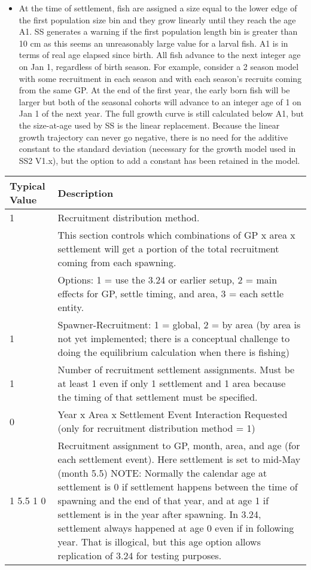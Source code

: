\begin{description}
\begin{itemize}
		\item At the time of settlement, fish are assigned a size equal to the lower edge of the first population size bin and they grow linearly until they reach the age A1.  SS generates a warning if the first population length bin is greater than 10 cm as this seems an unreasonably large value for a larval fish.  A1 is in terms of real age elapsed since birth.  All fish advance to the next integer age on Jan 1, regardless of birth season.  For example, consider a 2 season model with some recruitment in each season and with each season’s recruits coming from the same GP.  At the end of the first year, the early born fish will be larger but both of the seasonal cohorts will advance to an integer age of 1 on Jan 1 of the next year.  The full growth curve is still calculated below A1, but the size-at-age used by SS is the linear replacement.  Because the linear growth trajectory can never go negative, there is no need for the additive constant to the standard deviation (necessary for the growth model used in SS2 V1.x), but the option to add a constant has been retained in the model.
	\end{itemize}
\end{description}
	
	
\begin{longtable}{p{0.5cm} p{2cm} p{12cm}}
	\multicolumn{2}{l}{Typical Value} & Description \\
	\hline		
	1 & & Recruitment distribution method.  \\
		& &  This section controls which combinations of GP x area x settlement will get a portion of the total recruitment coming from each spawning.  \\
		& &  Options: 1 = use the 3.24 or earlier setup, 2 = main effects for GP, settle timing, and area, 3 = each settle entity.\\
	\hline
	1 & & Spawner-Recruitment: 1 = global, 2 = by area (by area is not yet implemented; there is a conceptual challenge to doing the equilibrium calculation when there is fishing)\\
	\hline
	1 & & Number of recruitment settlement assignments.  Must be at least 1 even if only 1 settlement and 1 area because the timing of that settlement must be specified.\\
	\hline
	0 & & Year x Area x Settlement Event Interaction Requested (only for recruitment distribution method = 1)\\
	\hline
	\multicolumn{2}{l}{1 5.5 1 0}& Recruitment assignment to GP, month, area, and age (for each settlement event).  Here settlement is set to mid-May (month 5.5) NOTE:  Normally the calendar age at settlement is 0 if settlement happens between the time of spawning and the end of that year, and at age 1 if settlement is in the year after spawning.  In 3.24, settlement always happened at age 0 even if in following year.  That is illogical, but this age option allows replication of 3.24 for testing purposes.
	\\
	\hline
\end{longtable}


